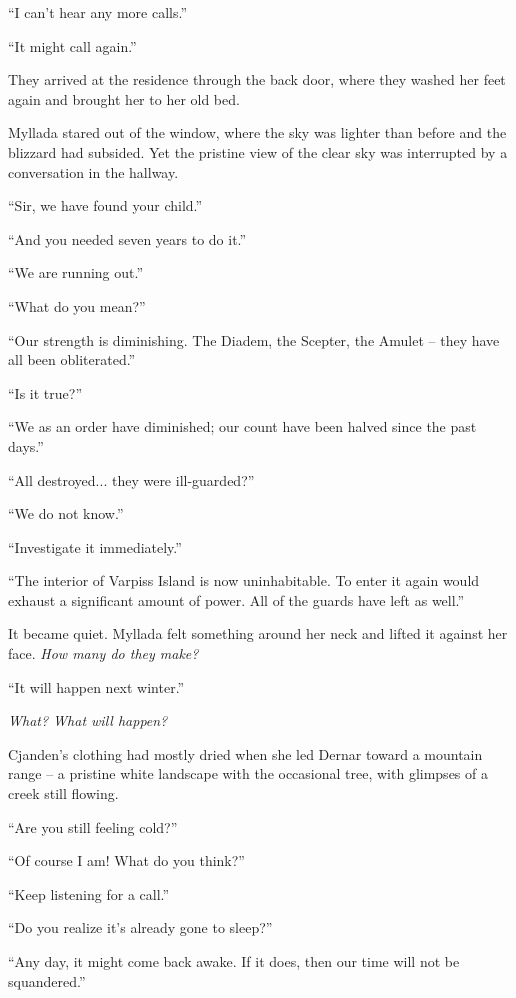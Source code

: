 ``I can't hear any more calls.''

``It might call again.''

\centeredstars

They arrived at the residence through the back door, where they washed her feet again and brought her to her old bed.

Myllada stared out of the window, where the sky was lighter than before and the blizzard had subsided. Yet the pristine view of the clear sky was interrupted by a conversation in the hallway.

``Sir, we have found your child.''

``And you needed seven years to do it.''

``We are running out.''

``What do you mean?''

``Our strength is diminishing. The Diadem, the Scepter, the Amulet -- they have all been obliterated.''

``Is it true?''

``We as an order have diminished; our count have been halved since the past days.''

``All destroyed... they were ill-guarded?''

``We do not know.''

``Investigate it immediately.''

``The interior of Varpiss Island is now uninhabitable. To enter it again would exhaust a significant amount of power. All of the guards have left as well.''

It became quiet. Myllada felt something around her neck and lifted it against her face. \emph{How many do they make?}

``It will happen next winter.''

\emph{What? What will happen?}

\centeredstars

Cjanden's clothing had mostly dried when she led Dernar toward a mountain range -- a pristine white landscape with the occasional tree, with glimpses of a creek still flowing.

``Are you still feeling cold?''

``Of course I am! What do you think?''

``Keep listening for a call.''

``Do you realize it's already gone to sleep?''

``Any day, it might come back awake. If it does, then our time will not be squandered.''

